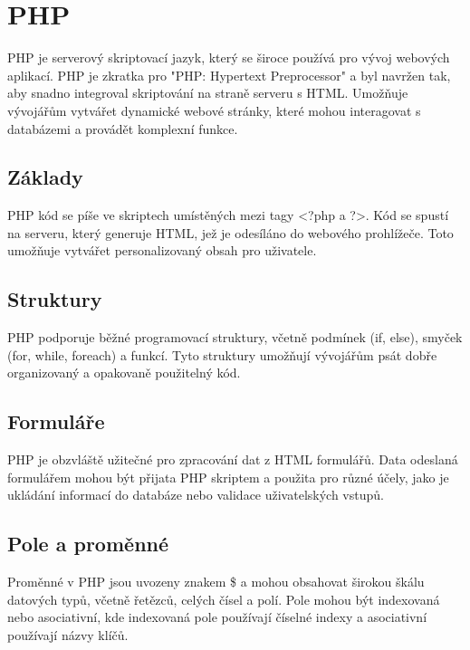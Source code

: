 \chapter{PHP} %
\label{cha:PHP}

PHP je serverový skriptovací jazyk, který se široce používá pro vývoj webových aplikací. PHP je zkratka pro "PHP: Hypertext Preprocessor" a byl navržen tak, aby snadno integroval skriptování na straně serveru s HTML. Umožňuje vývojářům vytvářet dynamické webové stránky, které mohou interagovat s databázemi a provádět komplexní funkce.

\section{Základy}
PHP kód se píše ve skriptech umístěných mezi tagy <?php a ?>. Kód se spustí na serveru, který generuje HTML, jež je odesíláno do webového prohlížeče. Toto umožňuje vytvářet personalizovaný obsah pro uživatele.

\section{Struktury}
PHP podporuje běžné programovací struktury, včetně podmínek (if, else), smyček (for, while, foreach) a funkcí. Tyto struktury umožňují vývojářům psát dobře organizovaný a opakovaně použitelný kód.

\section{Formuláře}
PHP je obzvláště užitečné pro zpracování dat z HTML formulářů. Data odeslaná formulářem mohou být přijata PHP skriptem a použita pro různé účely, jako je ukládání informací do databáze nebo validace uživatelských vstupů.

\section{Pole a proměnné}
Proměnné v PHP jsou uvozeny znakem \$ a mohou obsahovat širokou škálu datových typů, včetně řetězců, celých čísel a polí. Pole mohou být indexovaná nebo asociativní, kde indexovaná pole používají číselné indexy a asociativní používají názvy klíčů.

